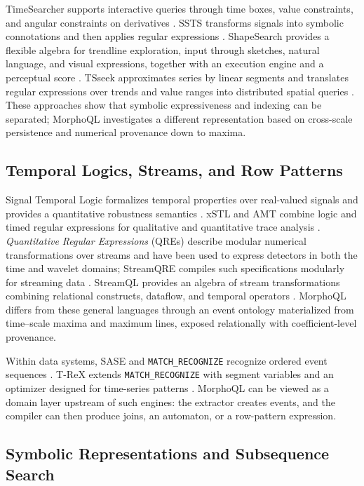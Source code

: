 \documentclass[11pt,a4paper]{article}
\newcommand{\code}[1]{\texttt{#1}}
\begin{document}
TimeSearcher supports interactive queries through time boxes, value constraints, and angular constraints on derivatives \cite{hochheiser2004}. SSTS transforms signals into symbolic connotations and then applies regular expressions \cite{rodrigues2019}. ShapeSearch provides a flexible algebra for trendline exploration, input through sketches, natural language, and visual expressions, together with an execution engine and a perceptual score \cite{siddiqui2020}. TSseek approximates series by linear segments and translates regular expressions over trends and value ranges into distributed spatial queries \cite{litsseek2026}. These approaches show that symbolic expressiveness and indexing can be separated; MorphoQL investigates a different representation based on cross-scale persistence and numerical provenance down to maxima.

\subsection{Temporal Logics, Streams, and Row Patterns}

Signal Temporal Logic formalizes temporal properties over real-valued signals and provides a quantitative robustness semantics \cite{maler2004,donze2010}. xSTL and AMT combine logic and timed regular expressions for qualitative and quantitative trace analysis \cite{nickovic2018}. \emph{Quantitative Regular Expressions} (QREs) describe modular numerical transformations over streams and have been used to express detectors in both the time and wavelet domains; StreamQRE compiles such specifications modularly for streaming data \cite{abbas2019,mamouras2017}. StreamQL provides an algebra of stream transformations combining relational constructs, dataflow, and temporal operators \cite{kong2020}. MorphoQL differs from these general languages through an event ontology materialized from time--scale maxima and maximum lines, exposed relationally with coefficient-level provenance.

Within data systems, SASE and \code{MATCH\_RECOGNIZE} recognize ordered event sequences \cite{gyllstrom2007,petkovic2022}. T-ReX extends \code{MATCH\_RECOGNIZE} with segment variables and an optimizer designed for time-series patterns \cite{huang2023}. MorphoQL can be viewed as a domain layer upstream of such engines: the extractor creates events, and the compiler can then produce joins, an automaton, or a row-pattern expression.

\subsection{Symbolic Representations and Subsequence Search}
\end{document}
